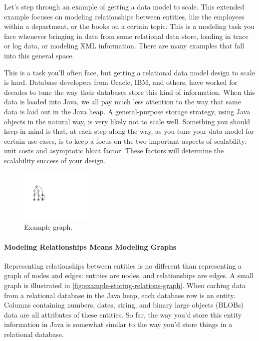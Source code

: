 Let's step through an example of getting a data model to scale. This extended
example focuses on modeling relationships between entities, like the employees
within a department, or the books on a certain topic. This is a modeling task
you face whenever bringing in data from some relational data store, loading in
trace or log data, or modeling XML information. There are many examples that
fall into this general space.

This is a task you'll often face, but getting a relational data model design to
scale is hard. Database developers from Oracle, IBM, and others, have worked for
decades to tune the way their databases store this kind of information. When
this data is loaded into Java, we all pay much less attention to the way that
same data is laid out in the Java heap. A general-purpose storage strategy,
using Java objects in the natural way, is very likely not to scale well.
Something you should keep in mind is that, at each step along the way, as you
tune your data model for certain use cases, is to keep a focus on the two
important aspects of scalability: unit costs and asymptotic bloat factor. These
factors will determine the scalability success of your design.

\begin{figure}
    \centering
	\includegraphics[width=0.3\textwidth]{part3/Figures/assessing/exampleGraph}
	\caption{Example graph.}
    \label{fig:example-storing-relations-graph}
\end{figure}
\paragraph{Modeling Relationships Means Modeling Graphs}
Representing relationships between entities is no different than representing a
graph of nodes and edges: entities are nodes, and relationships are edges. A
small graph is illustrated in \autoref{fig:example-storing-relations-graph}.
When caching data from a relational database in the Java heap, each
database row is an entity. Columns containing numbers, dates, string, and binary
large objects (BLOBs) data are all attributes of these entities. So far, the way
you'd store this entity information in Java is somewhat similar to the way you'd
store things in a relational database.

